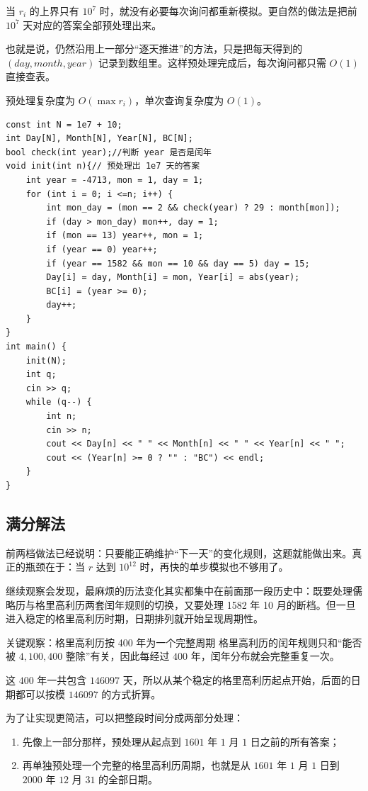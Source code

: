 \documentclass{book}
\begin{document}
当 $r_i$ 的上界只有 $10^7$ 时，就没有必要每次询问都重新模拟。更自然的做法是把前 $10^7$ 天对应的答案全部预处理出来。

也就是说，仍然沿用上一部分“逐天推进”的方法，只是把每天得到的 $(day,month,year)$ 记录到数组里。这样预处理完成后，每次询问都只需 $O(1)$ 直接查表。

预处理复杂度为 $O(\max r_i)$，单次查询复杂度为 $O(1)$。

    

        \begin{lstlisting}[style = code]
const int N = 1e7 + 10;
int Day[N], Month[N], Year[N], BC[N];
bool check(int year);//判断 year 是否是闰年
void init(int n){// 预处理出 1e7 天的答案
    int year = -4713, mon = 1, day = 1;
    for (int i = 0; i <=n; i++) {
        int mon_day = (mon == 2 && check(year) ? 29 : month[mon]);
        if (day > mon_day) mon++, day = 1;
        if (mon == 13) year++, mon = 1;
        if (year == 0) year++;
        if (year == 1582 && mon == 10 && day == 5) day = 15;
        Day[i] = day, Month[i] = mon, Year[i] = abs(year);
        BC[i] = (year >= 0);
        day++;
    }
}
int main() {
    init(N);
    int q;
    cin >> q;
    while (q--) {
        int n;
        cin >> n;
        cout << Day[n] << " " << Month[n] << " " << Year[n] << " ";
        cout << (Year[n] >= 0 ? "" : "BC") << endl;
    }
}\end{lstlisting}
\newpage
\subsection{满分解法}
前两档做法已经说明：只要能正确维护“下一天”的变化规则，这题就能做出来。真正的瓶颈在于：当 $r$ 达到 $10^{12}$ 时，再快的单步模拟也不够用了。

继续观察会发现，最麻烦的历法变化其实都集中在前面那一段历史中：既要处理儒略历与格里高利历两套闰年规则的切换，又要处理 1582 年 10 月的断档。但一旦进入稳定的格里高利历时期，日期排列就开始呈现周期性。

\begin{keybox}{关键观察：格里高利历按 400 年为一个完整周期}
格里高利历的闰年规则只和“能否被 $4,100,400$ 整除”有关，因此每经过 $400$ 年，闰年分布就会完整重复一次。

这 $400$ 年一共包含 $146097$ 天，所以从某个稳定的格里高利历起点开始，后面的日期都可以按模 $146097$ 的方式折算。
\end{keybox}

为了让实现更简洁，可以把整段时间分成两部分处理：

\begin{enumerate}[leftmargin=2em,itemsep=1pt,topsep=2pt,parsep=0pt,partopsep=0pt]
    \item 先像上一部分那样，预处理从起点到 $1601$ 年 $1$ 月 $1$ 日之前的所有答案；
    \item 再单独预处理一个完整的格里高利历周期，也就是从 $1601$ 年 $1$ 月 $1$ 日到 $2000$ 年 $12$ 月 $31$ 的全部日期。
\end{enumerate}
\end{document}
